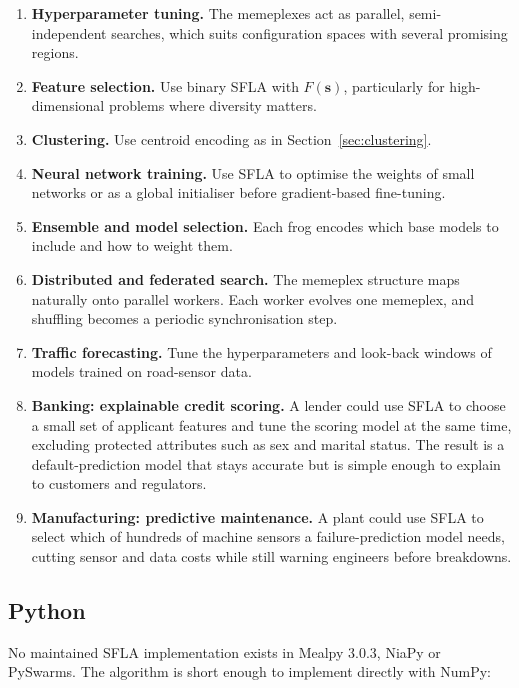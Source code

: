 \documentclass[11pt,a4paper]{article}
\newcommand{\vect}[1]{\mathbf{#1}}
\begin{document}
\begin{enumerate}
  \item \textbf{Hyperparameter tuning.} The memeplexes act as parallel, semi-independent searches, which suits configuration spaces with several promising regions.
  \item \textbf{Feature selection.} Use binary SFLA with $F(\vect{s})$, particularly for high-dimensional problems where diversity matters.
  \item \textbf{Clustering.} Use centroid encoding as in Section~\ref{sec:clustering}.
  \item \textbf{Neural network training.} Use SFLA to optimise the weights of small networks or as a global initialiser before gradient-based fine-tuning.
  \item \textbf{Ensemble and model selection.} Each frog encodes which base models to include and how to weight them.
  \item \textbf{Distributed and federated search.} The memeplex structure maps naturally onto parallel workers. Each worker evolves one memeplex, and shuffling becomes a periodic synchronisation step.
  \item \textbf{Traffic forecasting.} Tune the hyperparameters and look-back windows of models trained on road-sensor data.
  \item \textbf{Banking: explainable credit scoring.} A lender could use SFLA to choose a small set of applicant features and tune the scoring model at the same time, excluding protected attributes such as sex and marital status. The result is a default-prediction model that stays accurate but is simple enough to explain to customers and regulators.
  \item \textbf{Manufacturing: predictive maintenance.} A plant could use SFLA to select which of hundreds of machine sensors a failure-prediction model needs, cutting sensor and data costs while still warning engineers before breakdowns.
\end{enumerate}

\subsection{Python}

No maintained SFLA implementation exists in Mealpy 3.0.3, NiaPy or PySwarms. The algorithm is short enough to implement directly with NumPy:
\end{document}
